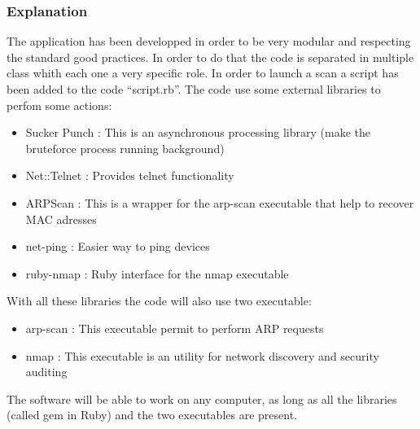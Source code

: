 \documentclass{report}
\begin{document}
\subsubsection{Explanation}
The application has been developped in order to be very modular and respecting the standard good practices. In order to do that the code is separated in multiple class whith each one a very specific role. In order to launch a scan a script has been added to the code ``script.rb''.\newline
The code use some external libraries to perfom some actions:
\begin{itemize}
 \item Sucker Punch \autocite{suckerpunch}: This is an asynchronous processing library (make the bruteforce process running background)
 \item Net::Telnet \autocite{nettelnet}: Provides telnet functionality
 \item ARPScan \autocite{arpscan}: This is a wrapper for the arp-scan executable that help to recover MAC adresses
 \item net-ping \autocite{netping}: Easier way to ping devices
 \item ruby-nmap \autocite{rubynmap}: Ruby interface for the nmap executable
\end{itemize}
With all these libraries the code will also use two executable:
\begin{itemize}
 \item arp-scan \autocite{arp-scan}: This executable permit to perform ARP requests
 \item nmap \autocite{nmap}: This executable is an utility for network discovery and security auditing
\end{itemize}
The software will be able to work on any computer, as long as all the libraries (called gem in Ruby) and the two executables are present.
\end{document}
